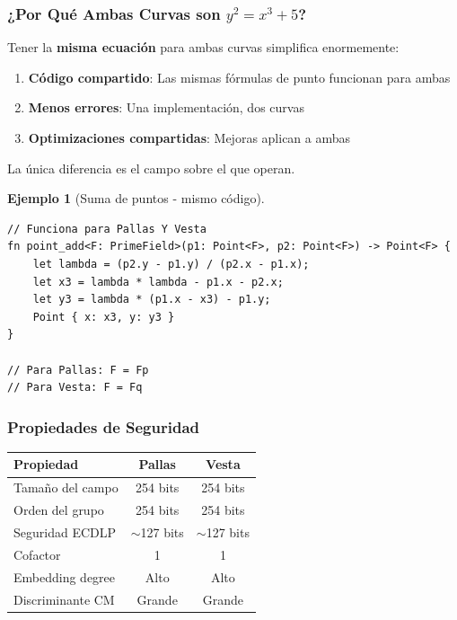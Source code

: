 \documentclass[11pt,a4paper,twoside,openright]{book}
\theoremstyle{definition}
\newtheorem{example}{Ejemplo}[chapter]
\theoremstyle{plain}
\theoremstyle{remark}
\begin{document}
\subsubsection{¿Por Qué Ambas Curvas son $y^2 = x^3 + 5$?}

\begin{keyidea}
Tener la \textbf{misma ecuación} para ambas curvas simplifica enormemente:
\begin{enumerate}
    \item \textbf{Código compartido}: Las mismas fórmulas de punto funcionan para ambas
    \item \textbf{Menos errores}: Una implementación, dos curvas
    \item \textbf{Optimizaciones compartidas}: Mejoras aplican a ambas
\end{enumerate}

La única diferencia es el campo sobre el que operan.
\end{keyidea}

\begin{example}[Suma de puntos - mismo código]
\begin{verbatim}
// Funciona para Pallas Y Vesta
fn point_add<F: PrimeField>(p1: Point<F>, p2: Point<F>) -> Point<F> {
    let lambda = (p2.y - p1.y) / (p2.x - p1.x);
    let x3 = lambda * lambda - p1.x - p2.x;
    let y3 = lambda * (p1.x - x3) - p1.y;
    Point { x: x3, y: y3 }
}

// Para Pallas: F = Fp
// Para Vesta: F = Fq
\end{verbatim}
\end{example}

\subsubsection{Propiedades de Seguridad}

\begin{center}
\begin{tabular}{lcc}
\toprule
\textbf{Propiedad} & \textbf{Pallas} & \textbf{Vesta} \\
\midrule
Tamaño del campo & 254 bits & 254 bits \\
Orden del grupo & 254 bits & 254 bits \\
Seguridad ECDLP & $\sim$127 bits & $\sim$127 bits \\
Cofactor & 1 & 1 \\
Embedding degree & Alto & Alto \\
Discriminante CM & Grande & Grande \\
\bottomrule
\end{tabular}
\end{center}
\end{document}
